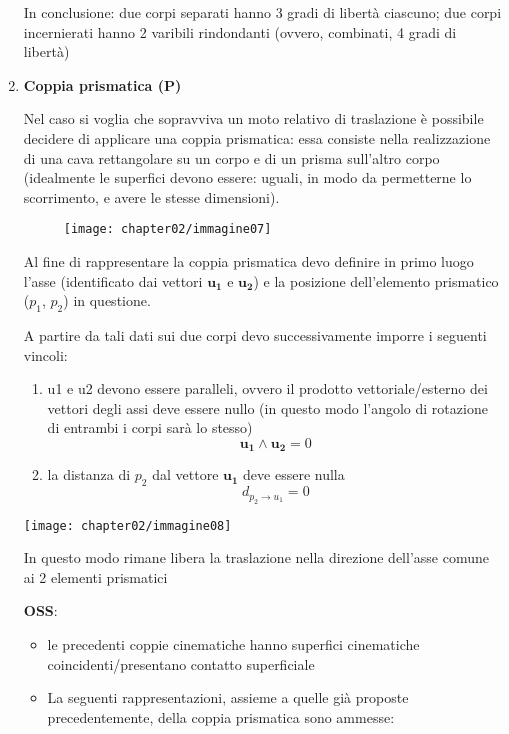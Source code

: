 \begin{enumerate}
						In conclusione: due corpi separati hanno 3 gradi di libertà ciascuno;
						due corpi incernierati hanno 2 varibili rindondanti (ovvero, combinati, 4 gradi di libertà)

					\item \textbf{Coppia prismatica (P)}

						Nel caso si voglia che sopravviva un moto relativo di traslazione è possibile decidere di applicare una coppia prismatica: essa consiste nella realizzazione di una cava rettangolare su un corpo e di un prisma sull'altro corpo (idealmente le superfici devono essere: uguali, in modo da permetterne lo scorrimento, e avere le stesse dimensioni).

			\begin{figure}[h]
				\centering
				\texttt{[image: chapter02/immagine07]}
			\end{figure}

				Al fine di rappresentare la coppia prismatica devo definire in primo luogo l'asse (identificato dai vettori $\mathbf{u_1}$ e $\mathbf{u_2}$) e la posizione dell'elemento prismatico ($p_1$, $p_2$) in questione.

			\begin{minipage}{.45\textwidth}
				A partire da tali dati sui due corpi devo successivamente imporre i seguenti vincoli:
				\begin{enumerate}
					\item u1 e u2 devono essere paralleli, ovvero il prodotto vettoriale/esterno dei vettori degli assi deve essere nullo
						(in questo modo l'angolo di rotazione di entrambi i corpi sarà lo stesso)
						\[ \mathbf{u_1} \wedge \mathbf{u_2} = 0\]
					\item la distanza di $p_2$ dal vettore $\mathbf{u_1}$ deve essere nulla  \[d_{p_2 \to u_1} = 0\]
				\end{enumerate}
			\end{minipage}
			\hfill
			\begin{minipage}{.45\textwidth}
				\centering
				\texttt{[image: chapter02/immagine08]}
			\end{minipage}

			In questo modo rimane libera la traslazione nella direzione dell'asse comune ai 2 elementi prismatici

			\textbf{OSS}: \begin{itemize} \item le precedenti coppie cinematiche hanno superfici cinematiche coincidenti/presentano contatto superficiale
								\item La seguenti rappresentazioni, assieme a quelle già proposte precedentemente, della coppia prismatica sono ammesse:


\end{itemize}
\end{enumerate}
